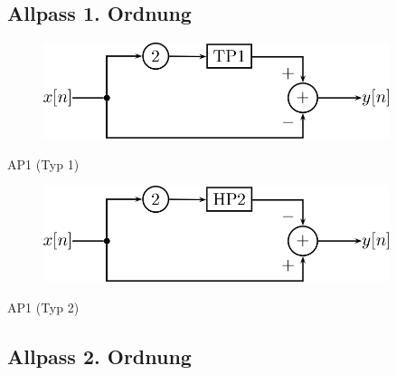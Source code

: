 \documentclass[a4paper, 12pt]{report}
\begin{document}
		\vspace{-0.3cm}
		
		\subsection*{Allpass 1. Ordnung}
		
		\vspace{-0.8cm}
			
			\begin{minipage}[t]{0.5\textwidth}
				\begin{figure}[H]
					\centering
					\includegraphics[width=0.9\textwidth]{images/parallel_ap1_1.png}
				\end{figure}
				\begin{center}
					AP1 (Typ 1)
				\end{center}
			\end{minipage}
			\begin{minipage}[t]{0.5\textwidth}
				\begin{figure}[H]
					\centering
					\includegraphics[width=0.9\textwidth]{images/parallel_ap1_2.png}
				\end{figure}
				\begin{center}
					AP1 (Typ 2)
				\end{center}
			\end{minipage}
			
		\subsection*{Allpass 2. Ordnung}
		\vspace{-0.8cm}
			
\end{document}
